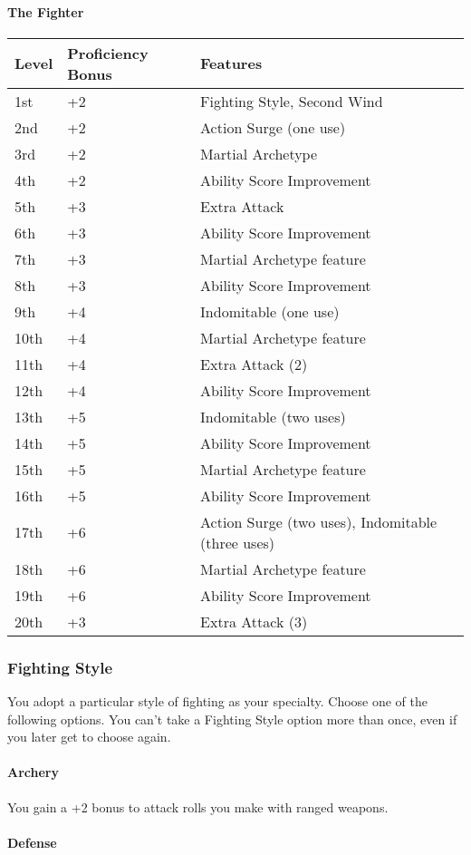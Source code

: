 \documentclass[
]{article}
\begin{document}
\hypertarget{the-fighter}{%
\paragraph{The Fighter}\label{the-fighter}}

\begin{longtable}[]{@{}lll@{}}
\toprule
Level & Proficiency Bonus & Features\tabularnewline
\midrule
\endhead
1st & +2 & Fighting Style, Second Wind\tabularnewline
2nd & +2 & Action Surge (one use)\tabularnewline
3rd & +2 & Martial Archetype\tabularnewline
4th & +2 & Ability Score Improvement\tabularnewline
5th & +3 & Extra Attack\tabularnewline
6th & +3 & Ability Score Improvement\tabularnewline
7th & +3 & Martial Archetype feature\tabularnewline
8th & +3 & Ability Score Improvement\tabularnewline
9th & +4 & Indomitable (one use)\tabularnewline
10th & +4 & Martial Archetype feature\tabularnewline
11th & +4 & Extra Attack (2)\tabularnewline
12th & +4 & Ability Score Improvement\tabularnewline
13th & +5 & Indomitable (two uses)\tabularnewline
14th & +5 & Ability Score Improvement\tabularnewline
15th & +5 & Martial Archetype feature\tabularnewline
16th & +5 & Ability Score Improvement\tabularnewline
17th & +6 & Action Surge (two uses), Indomitable (three
uses)\tabularnewline
18th & +6 & Martial Archetype feature\tabularnewline
19th & +6 & Ability Score Improvement\tabularnewline
20th & +3 & Extra Attack (3)\tabularnewline
\bottomrule
\end{longtable}

\hypertarget{fighting-style}{%
\subsubsection{Fighting Style}\label{fighting-style}}

You adopt a particular style of fighting as your specialty. Choose one
of the following options. You can't take a Fighting Style option more
than once, even if you later get to choose again.

\hypertarget{archery}{%
\paragraph{Archery}\label{archery}}

You gain a +2 bonus to attack rolls you make with ranged weapons.

\hypertarget{defense}{%
\paragraph{Defense}\label{defense}}
\end{document}
